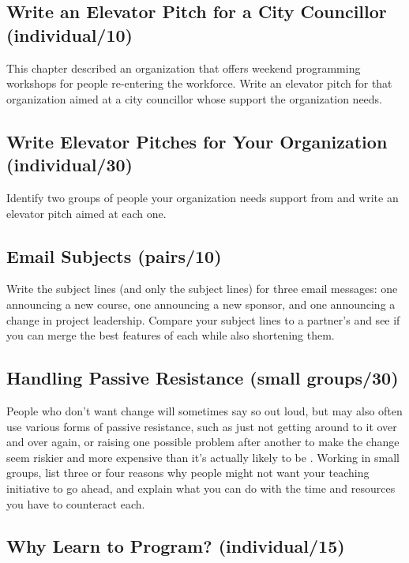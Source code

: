 \subsection*{Write an Elevator Pitch for a City Councillor (individual/10)}

This chapter described an organization
that offers weekend programming workshops for people re-entering the workforce.
Write an elevator pitch for that organization
aimed at a city councillor whose support the organization needs.

\subsection*{Write Elevator Pitches for Your Organization (individual/30)}

Identify two groups of people your organization needs support from
and write an elevator pitch aimed at each one.

\subsection*{Email Subjects (pairs/10)}

Write the subject lines (and only the subject lines) for three email messages:
one announcing a new course,
one announcing a new sponsor,
and one announcing a change in project leadership.
Compare your subject lines to a partner's
and see if you can merge the best features of each while also shortening them.

\subsection*{Handling Passive Resistance (small groups/30)}

People who don't want change will sometimes say so out loud,
but may also often use various forms of passive resistance,
such as just not getting around to it over and over again,
or raising one possible problem after another
to make the change seem riskier and more expensive than it's actually likely to be
\cite{Scot1987}.
Working in small groups,
list three or four reasons why people might not want your teaching initiative to go ahead,
and explain what you can do with the time and resources you have to counteract each.

\subsection*{Why Learn to Program? (individual/15)}

